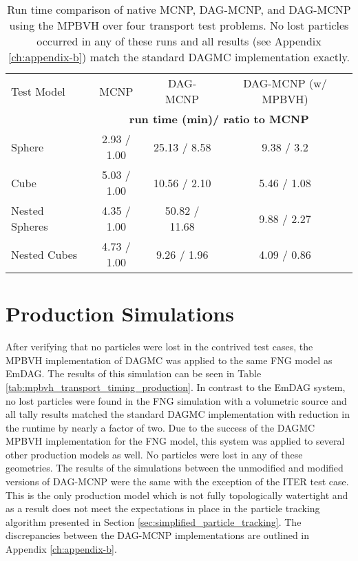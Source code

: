 \begin{table}[H]
  \small
  \begin{center}
    \begin{tabular}{lccc}

      \toprule
      Test Model & MCNP & DAG-MCNP & DAG-MCNP (w/ MPBVH) \\
      & \multicolumn{3}{c}{\textbf{run time (min)/ ratio to MCNP}} \\
      \hline
      Sphere         & 2.93 / 1.00 & 25.13 / 8.58  & 9.38 / 3.2  \\
      Cube           & 5.03 / 1.00 & 10.56 / 2.10 & 5.46 / 1.08 \\
      Nested Spheres & 4.35 / 1.00  & 50.82 / 11.68  & 9.88 / 2.27 \\
      Nested Cubes   & 4.73 / 1.00 & 9.26 / 1.96 & 4.09 / 0.86 \\
      \bottomrule
    \end{tabular}
  \end{center}
  \caption[Performance results for simple DAG-MCNP test cases.]{Run time
    comparison of native MCNP, DAG-MCNP, and DAG-MCNP using the MPBVH over four
    transport test problems. No lost particles occurred in any of these runs and
    all results (see Appendix \ref{ch:appendix-b}) match the standard DAGMC
    implementation exactly.}
  \label{tab:mpbvh_transport_timing_simple}
\end{table}

\section{Production Simulations}\label{subsec:mpbvh_production_transport}

After verifying that no particles were lost in the contrived test cases, the
MPBVH implementation of DAGMC was applied to the same FNG model as EmDAG. The
results of this simulation can be seen in Table
\ref{tab:mpbvh_transport_timing_production}. In contrast to the EmDAG system, no
lost particles were found in the FNG simulation with a volumetric source and all
tally results matched the standard DAGMC implementation with reduction in the
runtime by nearly a factor of two. Due to the success of the DAGMC MPBVH
implementation for the FNG model, this system was applied to several other
production models as well. No particles were lost in any of these
geometries. The results of the simulations between the unmodified and modified
versions of DAG-MCNP were the same with the exception of the ITER test
case. This is the only production model which is not fully topologically
watertight and as a result does not meet the expectations in place in the
particle tracking algorithm presented in Section
\ref{sec:simplified_particle_tracking}. The discrepancies between the DAG-MCNP
implementations are outlined in Appendix \ref{ch:appendix-b}.

